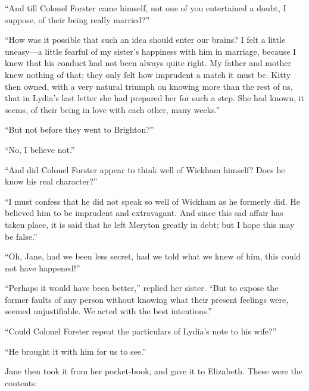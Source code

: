 \documentclass[12pt,english]{book}
\begin{document}
{}``And till Colonel Forster came himself, not one of you entertained
a doubt, I suppose, of their being really married?''\ 

{}``How was it possible that such an idea should enter our brains?
I felt a little uneasy\mbox{---}a little fearful of my sister's happiness
with him in marriage, because I knew that his conduct had not been
always quite right. My father and mother knew nothing of that; they
only felt how imprudent a match it must be. Kitty then owned, with
a very natural triumph on knowing more than the rest of us, that in
Lydia's last letter she had prepared her for such a step. She had
known, it seems, of their being in love with each other, many weeks.''

{}``But not before they went to Brighton?''\ 

{}``No, I believe not.''

{}``And did Colonel Forster appear to think well of Wickham himself?
Does he know his real character?''\ 

{}``I must confess that he did not speak so well of Wickham as he
formerly did. He believed him to be imprudent and extravagant. And
since this sad affair has taken place, it is said that he left Meryton
greatly in debt; but I hope this may be false.''

{}``Oh, Jane, had we been less secret, had we told what we knew of
him, this could not have happened!''\ 

{}``Perhaps it would have been better,'' replied her sister. {}``But
to expose the former faults of any person without knowing what their
present feelings were, seemed unjustifiable. We acted with the best
intentions.''

{}``Could Colonel Forster repeat the particulars of Lydia's note
to his wife?''\ 

{}``He brought it with him for us to see.''

Jane then took it from her pocket-book, and gave it to Elizabeth.
These were the contents:
\end{document}
